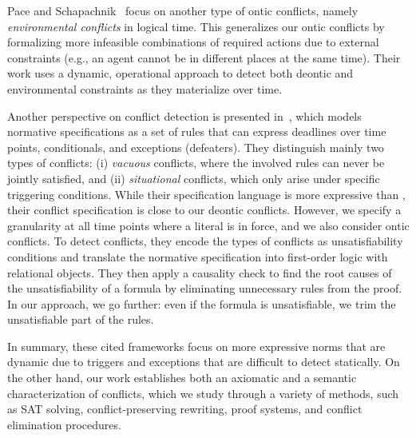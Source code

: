 Pace and Schapachnik~\cite{pace2020general} focus on another type of ontic conflicts, namely \emph{environmental conflicts} in logical time. This generalizes our ontic conflicts by formalizing more infeasible combinations of required actions due to external constraints (e.g., an agent cannot be in different places at the same time). Their work uses a dynamic, operational approach to detect both deontic and environmental constraints as they materialize over time.

Another perspective on conflict detection is presented in~\cite{10.1145/3597503.3639093}, which models normative specifications as a set of rules that can express deadlines over time points, conditionals, and exceptions (defeaters). They distinguish mainly two types of conflicts: (i) \emph{vacuous} conflicts, where the involved rules can never be jointly satisfied, and (ii) \emph{situational} conflicts, which only arise under specific triggering conditions. While their specification language  is more expressive than \TDDLfm, their conflict specification is close to our deontic conflicts. However, we specify a granularity at all time points where a literal is in force, and we also consider ontic conflicts. To detect conflicts, they encode the types of conflicts as unsatisfiability conditions and translate the normative specification into first-order logic with relational objects. They then apply a causality check to find the root causes of the unsatisfiability of a formula by eliminating unnecessary rules from the proof. In our approach, we go further: even if the formula is unsatisfiable, we trim the unsatisfiable part of the rules.

In summary, these cited frameworks focus on more expressive norms that are dynamic due to triggers and exceptions that are difficult to detect statically. On the other hand, our work establishes both an axiomatic and a semantic characterization of conflicts, which we study through a variety of methods, such as SAT solving, conflict-preserving rewriting, proof systems, and conflict elimination procedures.

